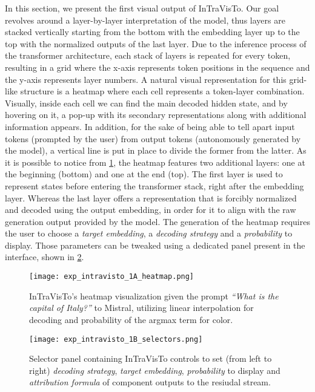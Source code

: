In this section, we present the first visual output of InTraVisTo.
Our goal revolves around a layer-by-layer interpretation of the model, thus layers are stacked vertically starting from the bottom with the embedding layer up to the top with the normalized outputs of the last layer.
Due to the inference process of the transformer architecture, each stack of layers is repeated for every token, resulting in a grid where the x-axis represents token positions in the sequence and the y-axis represents layer numbers.
A natural visual representation for this grid-like structure is a heatmap where each cell represents a token-layer combination.
Visually, inside each cell we can find the main decoded hidden state, and by hovering on it, a pop-up with its secondary representations along with additional information appears.
In addition, for the sake of being able to tell apart input tokens (prompted by the user) from output tokens (autonomously generated by the model), a vertical line is put in place to divide the former from the latter.
As it is possible to notice from \cref{fig:exp_intravisto_1_A}, the heatmap features two additional layers: one at the beginning (bottom) and one at the end (top).
The first layer is used to represent states before entering the transformer stack, right after the embedding layer.
Whereas the last layer offers a representation that is forcibly normalized and decoded using the output embedding, in order for it to align with the raw generation output provided by the model.
The generation of the heatmap requires the user to choose a \emph{target embedding}, a \emph{decoding strategy} and a \emph{probability} to display.
Those parameters can be tweaked using a dedicated panel present in the interface, shown in \cref{fig:exp_intravisto_1_B}.

\begin{figure}[t!]
    \centering
    \texttt{[image: exp\_intravisto\_1A\_heatmap.png]}
    \caption[InTraVisTo's heatmap visualization given the prompt \emph{``What is the capital of Italy?''} to Mistral.]{InTraVisTo's heatmap visualization given the prompt \emph{``What is the capital of Italy?''} to Mistral, utilizing linear interpolation for decoding and probability of the argmax term for color.}
    \label{fig:exp_intravisto_1_A}
\end{figure}

\begin{figure}[t!]
    \centering
    \texttt{[image: exp\_intravisto\_1B\_selectors.png]}
    \caption[Selector panel containing InTraVisTo controls.]{Selector panel containing InTraVisTo controls to set (from left to right) \emph{decoding strategy}, \emph{target embedding}, \emph{probability} to display and \emph{attribution formula} of component outputs to the resiudal stream.}
    \label{fig:exp_intravisto_1_B}
\end{figure}

